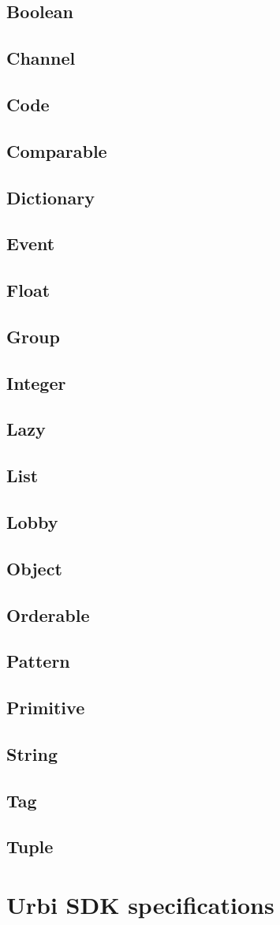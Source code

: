 \documentclass[openright,twoside,12pt]{report}
\newcommand{\urbi}{Urbi\xspace}
\begin{document}
\section{Boolean}
\section{Channel}
\section{Code}
\section{Comparable}
\section{Dictionary}
\section{Event}
\section{Float}
\section{Group}
\section{Integer}
\section{Lazy}
\section{List}
\section{Lobby}
\section{Object}
\section{Orderable}
\section{Pattern}
\section{Primitive}
\section{String}
\section{Tag}
\section{Tuple}

\chapter{\urbi SDK specifications}

\end{document}
